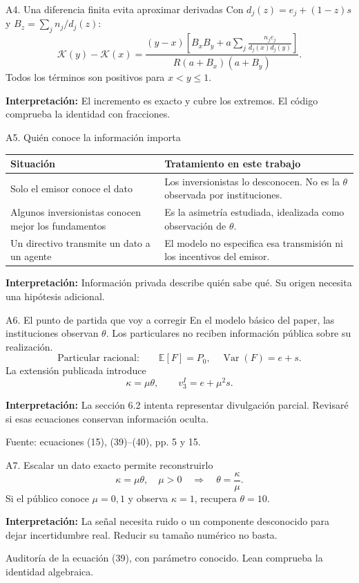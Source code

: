 \documentclass[aspectratio=169,11pt]{beamer}
\newcommand{\E}{\mathbb E}
\newcommand{\Var}{\operatorname{Var}}
\newcommand{\K}{\mathcal K}
\newcommand{\idea}[1]{\par\medskip\textbf{Interpretación:} #1}
\begin{document}
\begin{frame}{A4. Una diferencia finita evita aproximar derivadas}
Con \(d_j(z)=e_j+(1-z)s\) y \(B_z=\sum_j n_j/d_j(z)\):
\[
 \K(y)-\K(x)=
 \frac{(y-x)\left[B_xB_y+
 a\sum_j\frac{n_je_j}{d_j(x)d_j(y)}\right]}
 {R(a+B_x)(a+B_y)}.
\]
Todos los términos son positivos para \(x<y\leq1\).
\idea{El incremento es exacto y cubre los extremos.
El código comprueba la identidad con fracciones.}
\end{frame}

\begin{frame}{A5. Quién conoce la información importa}
\small
\begin{tabular}{p{4.1cm}p{7.4cm}}
\toprule
Situación & Tratamiento en este trabajo\\
\midrule
Solo el emisor conoce el dato
& Los inversionistas lo desconocen. No es la \(\theta\) observada por instituciones.\\[0.15cm]
Algunos inversionistas conocen mejor los fundamentos
& Es la asimetría estudiada, idealizada como observación de \(\theta\).\\[0.15cm]
Un directivo transmite un dato a un agente
& El modelo no especifica esa transmisión ni los incentivos del emisor.\\
\bottomrule
\end{tabular}
\normalsize
\idea{Información privada describe quién sabe qué. Su origen necesita
una hipótesis adicional.}
\end{frame}

\begin{frame}{A6. El punto de partida que voy a corregir}
En el modelo básico del paper, las instituciones observan \(\theta\).
Los particulares no reciben información pública sobre su realización.
\[
 \text{Particular racional:}\qquad
 \E[F]=P_0,\quad \Var(F)=e+s.
\]
La extensión publicada introduce
\[
 \kappa=\mu\theta,\qquad v_3^I=e+\mu^2s.
\]
\idea{La sección 6.2 intenta representar divulgación parcial.
Revisaré si esas ecuaciones conservan información oculta.}
\small\medskip\par
Fuente: ecuaciones (15), (39)--(40), pp. 5 y 15.
\end{frame}

\begin{frame}{A7. Escalar un dato exacto permite reconstruirlo}
\[
 \kappa=\mu\theta,\quad \mu>0
 \quad\Longrightarrow\quad \theta=\frac{\kappa}{\mu}.
\]
Si el público conoce \(\mu=0{,}1\) y observa \(\kappa=1\),
recupera \(\theta=10\).
\idea{La señal necesita ruido o un componente desconocido para dejar
incertidumbre real. Reducir su tamaño numérico no basta.}
\small\medskip\par
Auditoría de la ecuación (39), con parámetro conocido.
Lean comprueba la identidad algebraica.
\end{frame}
\end{document}
